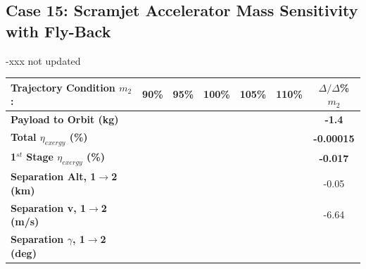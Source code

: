 \subsection{Case 15: Scramjet Accelerator Mass Sensitivity with Fly-Back}\label{sec:m2var}
-xxx not updated

\begin{table}[ht] %
\centering
\begin{tabular}{l c c c c c c} 
	\hline \textbf{Trajectory Condition}   \qquad  $m_{2}$:
	&90\%
	&95\%
	&100\%
	&105\%
	&110\%
	& $\Delta/\Delta$\%$m_{2}$
	\\
	\hline \textbf{Payload to Orbit (kg)}
	& \textbf{\PayloadToOrbitmSPARTANNinety}
	& \textbf{\PayloadToOrbitmSPARTANNinetyFive}
	& \textbf{\PayloadToOrbitmSPARTANStandard}
	& \textbf{\PayloadToOrbitmSPARTANOneHundredFive}
	& \textbf{\PayloadToOrbitmSPARTANOneHundredTen}
	&\textbf{-1.4}
	\\
	\textbf{Total $\eta_{exergy}$ (\%)}
	& \textbf{\totalExergyEffmSPARTANNinety}
	& \textbf{\totalExergyEffmSPARTANNinetyFive}
	& \textbf{\totalExergyEffmSPARTANStandard}
	& \textbf{\totalExergyEffmSPARTANOneHundredFive}
	& \textbf{\totalExergyEffmSPARTANOneHundredTen}
	& \textbf{-0.00015}
	\\
	\hline 
	\textbf{1$^{st}$ Stage $\eta_{exergy}$ (\%)}
	& \textbf{\firstExergyEffmSPARTANNinety}
	& \textbf{\firstExergyEffmSPARTANNinetyFive}
	& \textbf{\firstExergyEffmSPARTANStandard}
	& \textbf{\firstExergyEffmSPARTANOneHundredFive}
	& \textbf{\firstExergyEffmSPARTANOneHundredTen}
	& \textbf{-0.017}
	\\
	\textbf{Separation Alt, 1$\rightarrow$2 (km)}
	& \firstsecondSeparationAltmSPARTANNinety
	& \firstsecondSeparationAltmSPARTANNinetyFive
	& \firstsecondSeparationAltmSPARTANStandard
	& \firstsecondSeparationAltmSPARTANOneHundredFive
	& \firstsecondSeparationAltmSPARTANOneHundredTen
	&-0.05
	\\
	\textbf{Separation v, 1$\rightarrow$2 (m/s)}
	& \firstsecondSeparationvmSPARTANNinety
	& \firstsecondSeparationvmSPARTANNinetyFive
	& \firstsecondSeparationvmSPARTANStandard
	& \firstsecondSeparationvmSPARTANOneHundredFive
	& \firstsecondSeparationvmSPARTANOneHundredTen
	&-6.64
	\\
	\textbf{Separation $\gamma$, 1$\rightarrow$2 (deg)}
	& \firstsecondSeparationgammamSPARTANNinety
	& \firstsecondSeparationgammamSPARTANNinetyFive
	& \firstsecondSeparationgammamSPARTANStandard
	& \firstsecondSeparationgammamSPARTANOneHundredFive
	& \firstsecondSeparationgammamSPARTANOneHundredTen

\end{tabular}
\end{table}
